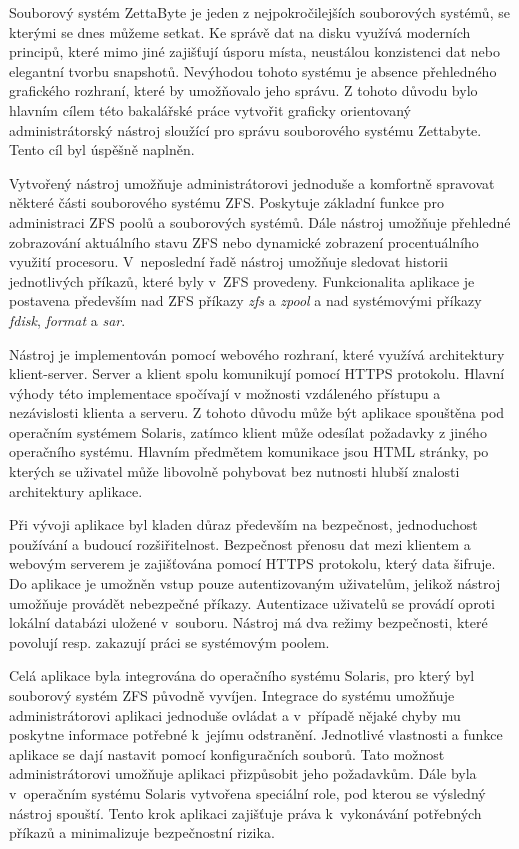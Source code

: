 Souborový systém ZettaByte je jeden z nejpokročilejších souborových systémů, se kterými se dnes můžeme setkat. Ke správě dat na disku využívá moderních principů, které mimo jiné zajišťují úsporu místa, neustálou konzistenci dat nebo elegantní tvorbu snapshotů. Nevýhodou tohoto systému je absence přehledného grafického rozhraní, které by umožňovalo jeho správu. Z tohoto důvodu bylo hlavním cílem této bakalářské práce vytvořit graficky orientovaný administrátorský nástroj sloužící pro správu souborového systému Zettabyte. Tento cíl byl úspěšně naplněn.

Vytvořený nástroj umožňuje administrátorovi jednoduše a komfortně spravovat některé části souborového systému ZFS. Poskytuje základní funkce pro administraci ZFS poolů a souborových systémů. Dále nástroj umožňuje přehledné zobrazování aktuálního stavu ZFS nebo dynamické zobrazení procentuálního využití procesoru. V~neposlední řadě nástroj umožňuje sledovat historii jednotlivých příkazů, které byly v~ZFS provedeny. Funkcionalita aplikace je postavena především nad ZFS příkazy \emph{zfs} a \emph{zpool} a nad systémovými příkazy \emph{fdisk}, \emph{format} a \emph{sar}.

Nástroj je implementován pomocí webového rozhraní, které využívá architektury klient-server. Server a klient spolu komunikují pomocí HTTPS protokolu. Hlavní výhody této implementace spočívají v možnosti vzdáleného přístupu a nezávislosti klienta a serveru. Z tohoto důvodu může být aplikace spouštěna pod operačním systémem Solaris, zatímco klient může odesílat požadavky z jiného operačního systému. Hlavním předmětem komunikace jsou HTML stránky, po kterých se uživatel může libovolně pohybovat bez nutnosti hlubší znalosti architektury aplikace.

Při vývoji aplikace byl kladen důraz především na bezpečnost, jednoduchost používání a budoucí rozšiřitelnost. Bezpečnost přenosu dat mezi klientem a webovým serverem je zajišťována pomocí HTTPS protokolu, který data šifruje. Do aplikace je umožněn vstup pouze autentizovaným uživatelům, jelikož nástroj umožňuje provádět nebezpečné příkazy. Autentizace uživatelů se provádí oproti lokální databázi uložené v~souboru. Nástroj má dva režimy bezpečnosti, které povolují resp. zakazují práci se systémovým poolem.

Celá aplikace byla integrována do operačního systému Solaris, pro který byl souborový systém ZFS původně vyvíjen. Integrace do systému umožňuje administrátorovi aplikaci jednoduše ovládat a v~případě nějaké chyby mu poskytne informace potřebné k~jejímu odstranění. Jednotlivé vlastnosti a funkce aplikace se dají nastavit pomocí konfiguračních souborů. Tato možnost administrátorovi umožňuje aplikaci přizpůsobit jeho požadavkům. Dále byla v~operačním systému Solaris vytvořena speciální role, pod kterou se výsledný nástroj spouští. Tento krok aplikaci zajišťuje práva k~vykonávání potřebných příkazů a minimalizuje bezpečnostní rizika.

